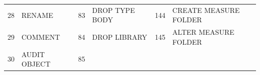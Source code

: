 \begin{appendix}
\begin{longtable}[]{@{}rl|rl|rl@{}}
\begin{minipage}[t]{0.06\columnwidth}\raggedright\strut
28\strut
\end{minipage} & \begin{minipage}[t]{0.19\columnwidth}\raggedright\strut
RENAME\strut
\end{minipage} & \begin{minipage}[t]{0.06\columnwidth}\raggedright\strut
83\strut
\end{minipage} & \begin{minipage}[t]{0.24\columnwidth}\raggedright\strut
DROP TYPE BODY\strut
\end{minipage} & \begin{minipage}[t]{0.06\columnwidth}\raggedright\strut
144\strut
\end{minipage} & \begin{minipage}[t]{0.24\columnwidth}\raggedright\strut
CREATE MEASURE FOLDER\strut
\end{minipage}\tabularnewline
\begin{minipage}[t]{0.06\columnwidth}\raggedright\strut
29\strut
\end{minipage} & \begin{minipage}[t]{0.19\columnwidth}\raggedright\strut
COMMENT\strut
\end{minipage} & \begin{minipage}[t]{0.06\columnwidth}\raggedright\strut
84\strut
\end{minipage} & \begin{minipage}[t]{0.24\columnwidth}\raggedright\strut
DROP LIBRARY\strut
\end{minipage} & \begin{minipage}[t]{0.06\columnwidth}\raggedright\strut
145\strut
\end{minipage} & \begin{minipage}[t]{0.24\columnwidth}\raggedright\strut
ALTER MEASURE FOLDER\strut
\end{minipage}\tabularnewline
\begin{minipage}[t]{0.06\columnwidth}\raggedright\strut
30\strut
\end{minipage} & \begin{minipage}[t]{0.19\columnwidth}\raggedright\strut
AUDIT OBJECT\strut
\end{minipage} & \begin{minipage}[t]{0.06\columnwidth}\raggedright\strut
85\strut
\end{minipage} & \begin{minipage}[t]{0.24\columnwidth}\raggedright\strut

\end{minipage}
\end{longtable}
\end{appendix}
